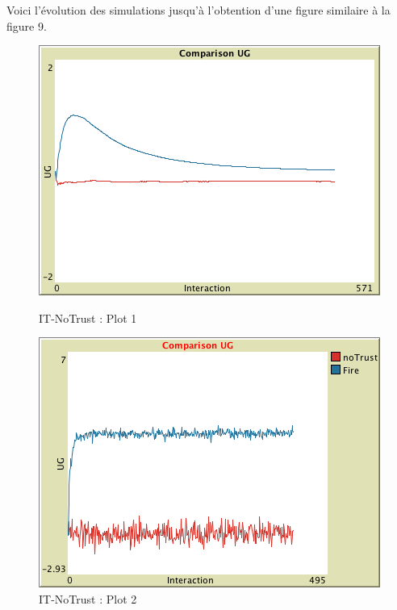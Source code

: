 Voici l'évolution des simulations jusqu'à l'obtention d'une figure similaire à la figure 9.
\begin{figure}[H]
   \begin{minipage}{0.48\textwidth}
     \centering
     \includegraphics[width=.7\linewidth]{images/evolutionIT/IT1.png}
     \caption{IT-NoTrust : Plot 1}\label{Fig:Data1}
   \end{minipage}\hfill
   \begin{minipage}{0.48\textwidth}
     \centering
     \includegraphics[width=.7\linewidth]{images/evolutionIT/IT2.png}
     \caption{IT-NoTrust : Plot 2}\label{Fig:Data2}
   \end{minipage}
\end{figure}

